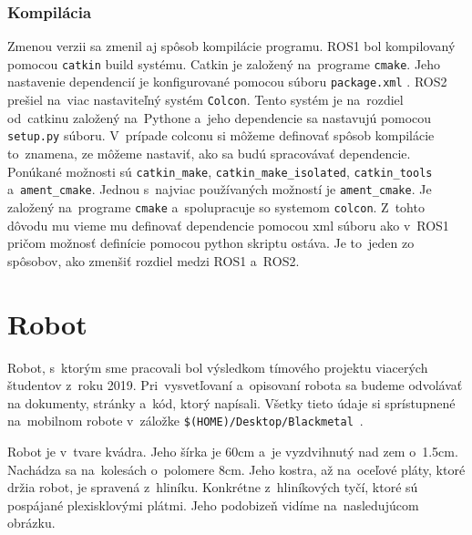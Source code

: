 \subsubsection{Kompilácia}

	Zmenou verzii sa zmenil aj spôsob kompilácie programu. ROS1 bol kompilovaný pomocou \texttt{catkin} build systému. Catkin je založený na~programe
	\texttt{cmake}. Jeho nastavenie dependencií je konfigurované pomocou súboru \texttt{package.xml} . ROS2 prešiel na~viac nastaviteľný systém \texttt{Colcon}.
	Tento systém je na~rozdiel od~catkinu založený na~Pythone a~jeho dependencie sa nastavujú pomocou \texttt{setup.py} súboru. V~prípade colconu si môžeme
	definovať spôsob kompilácie to~znamena, ze môžeme nastaviť, ako sa budú spracovávať dependencie. Ponúkané možnosti sú \texttt{catkin\_make},
	\texttt{catkin\_make\_isolated}, \texttt{catkin\_tools} a~\texttt{ament\_cmake}. Jednou s~najviac používaných možností je \texttt{ament\_cmake}.
	Je založený na~programe \texttt{cmake} a~spolupracuje so systemom \texttt{colcon}. Z~tohto dôvodu mu vieme mu definovať dependencie pomocou xml
	súboru ako v~ROS1 pričom možnosť definície pomocou python skriptu ostáva. Je to~jeden zo spôsobov, ako zmenšiť rozdiel medzi ROS1 a~ROS2.

\section{Robot}

Robot, s~ktorým sme pracovali bol výsledkom tímového projektu viacerých študentov \newline z~roku 2019. Pri~vysvetľovaní a~opisovaní robota sa budeme odvolávať
na dokumenty, stránky a~kód, ktorý napísali. Všetky tieto údaje si sprístupnené na~mobilnom robote v~záložke
\newline \texttt{\$(HOME)/Desktop/Blackmetal}~\cite{timovyProjekt}.

Robot je v~tvare kvádra. Jeho šírka je 60cm a~je vyzdvihnutý nad zem o~1.5cm. Nachádza sa na~kolesách o~polomere 8cm. Jeho kostra, až na~oceľové pláty, ktoré držia robot,
je spravená z~hliníku. Konkrétne z~hliníkových tyčí, ktoré sú pospájané plexisklovými plátmi. Jeho podobizeň vidíme na~nasledujúcom obrázku. 

